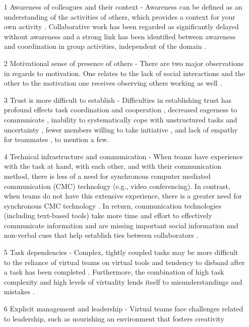 \begin{itemize}
\item [1] Awareness of colleagues and their context - Awareness can be defined as an understanding of the activities of others, which provides a context for your own activity \cite{Dourish1992}. Collaborative work has been regarded as significantly delayed without awareness \cite{Olson2014} and a strong link has been identified between awareness and coordination in group activities, independent of the domain \cite{Dourish1992}.
\item [2] Motivational sense of presence of others - There are two major observations in regards to motivation.  One relates to the lack of social interactions and the other to the motivation one receives observing others working as well \cite{Olson2014}.
\item [3] Trust is more difficult to establish - Difficulties in establishing trust has profound effects task coordination and cooperation \cite{Olson2014},  decreased eagerness to communicate \cite{Herbsleb1999},  inability to systematically cope with
unstructured tasks and uncertainty \cite{Jarvenpaa1999},  fewer members willing to take initiative \cite{Jarvenpaa1999}, and lack of empathy
for teammates \cite{Kiel2003}, to mention a few.
\item [4] Technical infrastructure and communication - When teams have experience with the task at hand, with each other, and with their communication method, there is less of a need for synchronous computer mediated communication (CMC) technology (e.g., video conferencing). In contrast, when teams do not have this extensive experience, there is a greater need for synchronous CMC technology \cite{Dennis2008}.  In return, communication technologies (including text-based tools) take more time and effort to effectively communicate information and are missing important social information and non-verbal cues that help establish ties between collaborators \cite{Dennis2008}.
\item [5] Task dependencies - Complex, tightly coupled tasks may be more difficult
to the reliance of virtual teams on virtual tools and tendency to disband after a task has been completed \cite{Bell2002}. Furthermore, the combination of high task complexity and
high levels of virtuality lends itself to misunderstandings and mistakes \cite{Olson2014}. 
\item [6] Explicit management and leadership - Virtual teams face challenges related to leadership, such as nourishing an environment that fosters creativity

\end{itemize}
